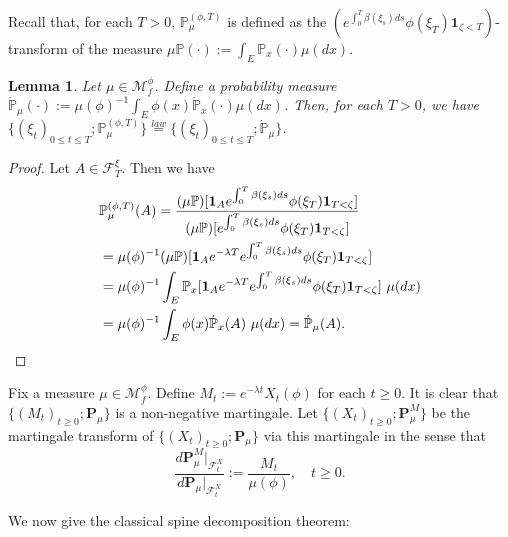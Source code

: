 \documentclass[UTF8]{pkuthss}
\theoremstyle{plain}
\newtheorem{lem}[thm]{Lemma}
\theoremstyle{definition}
\numberwithin{equation}{section}
\begin{document}
Recall that, for each $T>0$, $\mathbb P^{(\phi,T)}_\mu$ is defined as the $(e^{\int_0^T\beta(\xi_s)ds} \phi(\xi_T)\mathbf 1_{\zeta < T})$-transform of the measure 
	$\mu\mathbb P(\cdot):= \int_E \mathbb P_x(\cdot)\mu(dx)$.
\begin{lem}
\label{lem: measure of spine}
	Let $\mu \in \mathcal M_f^\phi$. Define
   a probability measure
	$\dot {\mathbb P}_\mu(\cdot):= \mu(\phi)^{-1}\int_E \phi(x)\dot {\mathbb P}_x(\cdot )\mu(dx)$.
Then, for each $T>0$, we have $\{(\xi_t)_{0\leq t\leq T}; \mathbb P_\mu^{(\phi,T)}\}\overset{law}{=}\{(\xi_t)_{0\leq t\leq T}; \dot{\mathbb P}_\mu\}$.
\end{lem}
\begin{proof}
	Let $A\in \mathscr F_T^\xi$. Then we have
\[\begin{split}
	&\mathbb P_\mu^{(\phi,T)}(A) = \frac{(\mu\mathbb P)[\mathbf 1_A e^{\int_0^T\beta(\xi_s)ds} \phi(\xi_T)\mathbf 1_{T < \zeta}]}{(\mu\mathbb P)[e^{\int_0^T\beta(\xi_s)ds} \phi(\xi_T)\mathbf 1_{T < \zeta}]}
	\\&=  \mu(\phi)^{-1}(\mu\mathbb P)[\mathbf 1_A e^{-\lambda T}e^{\int_0^T\beta(\xi_s)ds} \phi(\xi_T)\mathbf 1_{T < \zeta}]
	\\&=  \mu(\phi)^{-1}\int_E\mathbb P_x[\mathbf 1_A e^{-\lambda T}e^{\int_0^T\beta(\xi_s)ds} \phi(\xi_T)\mathbf 1_{T < \zeta}]~\mu(dx)
	\\&=  \mu(\phi)^{-1}\int_E\phi(x)\dot{\mathbb P}_x (A)~\mu(dx) = \dot{\mathbb P}_\mu(A). \qedhere
\end{split}\]
\end{proof}
\par
	Fix a measure $\mu \in \mathcal M^\phi_f$.
	Define $M_t := e^{-\lambda t}X_t(\phi)$ for each $t \geq 0$.
	It is clear that $\{(M_t)_{t\geq 0}; \mathbf P_\mu\}$ is a non-negative martingale.
	Let $\{(X_t)_{t\geq 0}; \mathbf P_\mu^M\}$ be the martingale transform of $\{(X_t)_{t\geq 0}; \mathbf P_\mu\}$ via this martingale in the sense that
\[
	\frac {d \mathbf P_\mu^M |_{\mathscr F_t^X}} {d \mathbf P_\mu |_{\mathscr F_t^X}}
	:= \frac {M_t} {\mu(\phi)},
	\quad t \geq 0.
\]
\par
	We now give the classical spine decomposition theorem:
\end{document}

